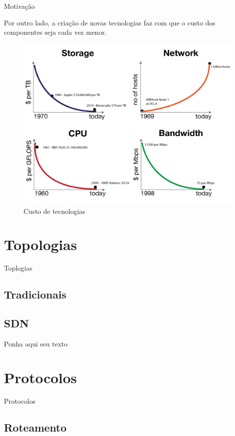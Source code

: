 \documentclass[aspectratio=169]{beamer}
\begin{document}
			
		\begin{frame} {Motivação}
				
			\Large
			Por outro lado, a criação de novas tecnologias faz com que o custo dos componentes seja cada vez menor.
			\begin{figure}[ht]    
						    \includegraphics[scale=0.35]{custo.png}
						    \caption{Custo de tecnologias}
						    \label{fig:sample_figure}
						\end{figure}
		\end{frame}	
			
		
	
\section{Topologias} {Toplogias}
	\subsection{Tradicionais}
	\subsection{SDN}
		
	\begin{frame} 
		Ponha aqui seu texto
	\end{frame}	

\section{Protocolos}{Protocolos}
	\subsection{Roteamento}
\end{document}
